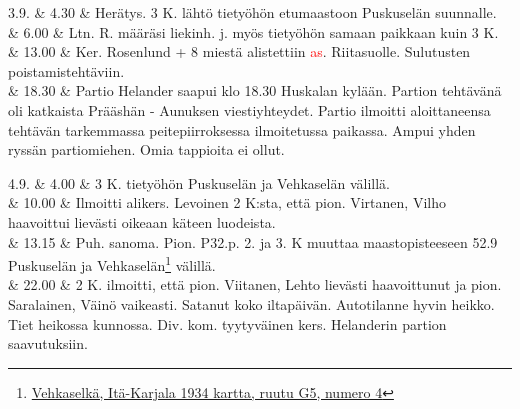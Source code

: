 \documentclass[11pt,a5paper,oneside]{book}
\begin{document}
\taulustop


3.9. & 4.30 & Herätys. 3 K. lähtö tietyöhön etumaastoon Puskuselän suunnalle. \\

& 6.00 & Ltn. R. määräsi liekinh. j. myös tietyöhön samaan paikkaan kuin 3 K. \newline \\

& 13.00 & Ker. Rosenlund + 8 miestä alistettiin \textcolor{red}{as}. Riitasuolle. Sulutusten poistamistehtäviin. \newline \\

& 18.30 & Partio Helander saapui klo 18.30 Huskalan kylään. Partion tehtävänä oli katkaista Prääshän - Aunuksen viestiyhteydet. Partio ilmoitti aloittaneensa tehtävän tarkemmassa peitepiirroksessa ilmoitetussa paikassa. Ampui yhden ryssän partiomiehen. Omia tappioita ei ollut. \\
\newpage

4.9. & 4.00 & 3 K. tietyöhön Puskuselän ja Vehkaselän välillä. \\

& 10.00 & Ilmoitti alikers. Levoinen 2 K:sta, että pion. Virtanen, Vilho haavoittui lievästi oikeaan käteen luodeista. \newline \\

& 13.15 & Puh. sanoma. Pion. P32.p. 2. ja 3. K muuttaa maastopisteeseen 52.9 Puskuselän ja Vehkaselän\footnote{\href{https://www.google.fi/maps/place/61\%C2\%B057'10.9\%22N+32\%C2\%B055'38.5\%22E/@61.953019,32.9266963,477m}{Vehkaselkä, Itä-Karjala 1934 kartta, ruutu G5, numero 4}} välillä. \\

& 22.00 & 2 K. ilmoitti, että pion. Viitanen, Lehto lievästi haavoittunut ja pion. Saralainen, Väinö vaikeasti. \newline Satanut koko iltapäivän. \newline Autotilanne hyvin heikko. \newline Tiet heikossa kunnossa. \newline Div. kom. tyytyväinen kers. Helanderin partion saavutuksiin. \\

\taulustop

\end{document}
